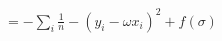 \documentclass[preview]{standalone}
\begin{document}
\begin{align*}
=  -\sum_i \frac{1}{n} -(y_i- \omega x_i)^2 +f(\sigma)
\end{align*}
\end{document}
